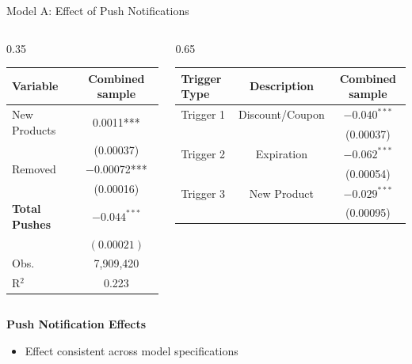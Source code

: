 \documentclass[aspectratio=169]{beamer}  %
\begin{document}
\begin{frame}{Model A: Effect of Push Notifications}

\begin{columns}
\begin{column}{0.35\linewidth}
\begin{table}
\centering
\scriptsize
\begin{tabular}{lc}
\toprule
\textbf{Variable} & \textbf{Combined sample} \\
\midrule
New Products & 0.0011*** \\
 & (0.00037) \\
Removed & $-$0.00072*** \\
 & (0.00016) \\
\textbf{Total Pushes} & $\mathbf{-0.044^{***}}$ \\
 & $\mathbf{(0.00021)}$ \\
\midrule
Obs. & 7,909,420 \\
R$^2$ & 0.223 \\
\bottomrule
\end{tabular}
\end{table}
\end{column}

\begin{column}{0.65\linewidth}
\begin{table}
\centering
\scriptsize
\begin{tabular}{lcc}
\toprule
\textbf{Trigger Type} & \textbf{Description} & \textbf{Combined sample} \\
\midrule
Trigger 1 & Discount/Coupon & $-0.040^{***}$ \\
 & & (0.00037) \\
Trigger 2 & Expiration & $-0.062^{***}$ \\
 & & (0.00054) \\
Trigger 3 & New Product & $-0.029^{***}$ \\
 & & (0.00095) \\
\bottomrule
\end{tabular}
\end{table}
\end{column}
\end{columns}

\textbf{Push Notification Effects}
\begin{itemize}
    \item Effect consistent across model specifications
\end{itemize}
\end{frame}
\end{document}
